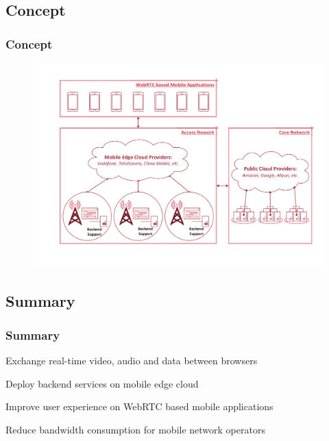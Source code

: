 \documentclass{beamer}
\begin{document}
\subsection{Concept}
\begin{frame}
\frametitle{Concept}
\begin{figure}[h!]
	\centering
	\includegraphics[scale=0.4]{figs/concept.pdf}
\end{figure}
\end{frame}
\subsection{Summary}
\begin{frame}
\frametitle{Summary}
\begin{alertblock}{Exchange}
real-time video, audio and data between browsers
\end{alertblock}

\begin{alertblock}{Deploy}
backend services on mobile edge cloud
\end{alertblock}

\begin{alertblock}{Improve}
user experience on WebRTC based mobile applications
\end{alertblock}

\begin{alertblock}{Reduce}
bandwidth consumption for mobile network operators
\end{alertblock}
\end{frame}

\end{document}

